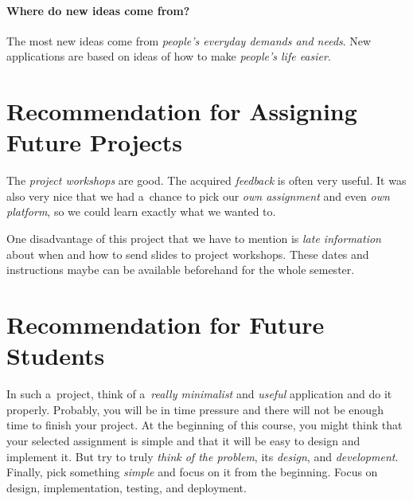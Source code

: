 \documentclass[12pt, a4paper, titlepage, final]{article}
\begin{document}
\paragraph{Where do new ideas come from? \\}

The most new ideas come from \emph{people's everyday demands and needs}. New
applications are based on ideas of how to make \emph{people's life easier}.


\section*{Recommendation for Assigning Future Projects}

The \emph{project workshops} are good. The acquired \emph{feedback} is often
very useful. It was also very nice that we had a~chance to pick
our \emph{own assignment} and even \emph{own platform}, so we could learn
exactly what we wanted to.

One disadvantage of this project that we have to mention is \emph{late
information} about when and how to send slides to project workshops.
These dates and instructions maybe can be available beforehand for the
whole semester.


\section*{Recommendation for Future Students}

In such a~project, think of a~\emph{really minimalist} and \emph{useful}
application and do it properly. Probably, you will be in time pressure and there
will not be enough time to finish your project. At the beginning of this
course, you might think that your selected assignment is simple and that
it will be easy to design and implement it. But try to truly \emph{think of
the problem}, its \emph{design}, and \emph{development}. Finally, pick something
\emph{simple} and focus on it from the beginning. Focus on design,
implementation, testing, and deployment.

\end{document}
